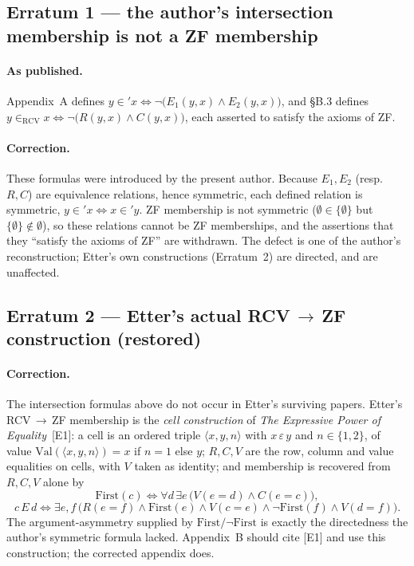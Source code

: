\documentclass[11pt]{article}
\newcommand{\eps}{\varepsilon}
\begin{document}
\subsection*{Erratum 1 --- the author's intersection membership is not a ZF membership}

\paragraph{As published.} Appendix~A defines $y \in' x \iff \neg\bigl(E_1(y, x) \land
E_2(y, x)\bigr)$, and \S B.3 defines $y \in_{\mathrm{RCV}} x \iff \neg\bigl(R(y, x) \land
C(y, x)\bigr)$, each asserted to satisfy the axioms of ZF.

\paragraph{Correction.} These formulas were introduced by the present author. Because
$E_1, E_2$ (resp.\ $R, C$) are equivalence relations, hence symmetric, each defined relation
is symmetric, $y \in' x \iff x \in' y$. ZF membership is not symmetric ($\emptyset \in
\{\emptyset\}$ but $\{\emptyset\} \notin \emptyset$), so these relations cannot be ZF
memberships, and the assertions that they ``satisfy the axioms of ZF'' are withdrawn. The
defect is one of the author's reconstruction; Etter's own constructions (Erratum~2) are
directed, and are unaffected.

\subsection*{Erratum 2 --- Etter's actual RCV\,$\to$\,ZF construction (restored)}

\paragraph{Correction.} The intersection formulas above do not occur in Etter's surviving
papers. Etter's RCV\,$\to$\,ZF membership is the \emph{cell construction} of \emph{The
Expressive Power of Equality}~[E1]: a cell is an ordered triple $\langle x, y, n\rangle$ with
$x \,\eps\, y$ and $n \in \{1, 2\}$, of value $\mathrm{Val}(\langle x, y, n\rangle) = x$ if
$n = 1$ else $y$; $R, C, V$ are the row, column and value equalities on cells, with $V$ taken
as identity; and membership is recovered from $R, C, V$ alone by
\[ \mathrm{First}(c) \iff \forall d\,\exists e\,\bigl(V(e{=}d) \land C(e{=}c)\bigr), \]
\[ c\,E\,d \iff \exists e, f\,\bigl(R(e{=}f) \land \mathrm{First}(e) \land V(c{=}e) \land
\neg\mathrm{First}(f) \land V(d{=}f)\bigr). \]
The argument-asymmetry supplied by $\mathrm{First}/\neg\mathrm{First}$ is exactly the
directedness the author's symmetric formula lacked. Appendix~B should cite [E1] and use this
construction; the corrected appendix does.
\end{document}
